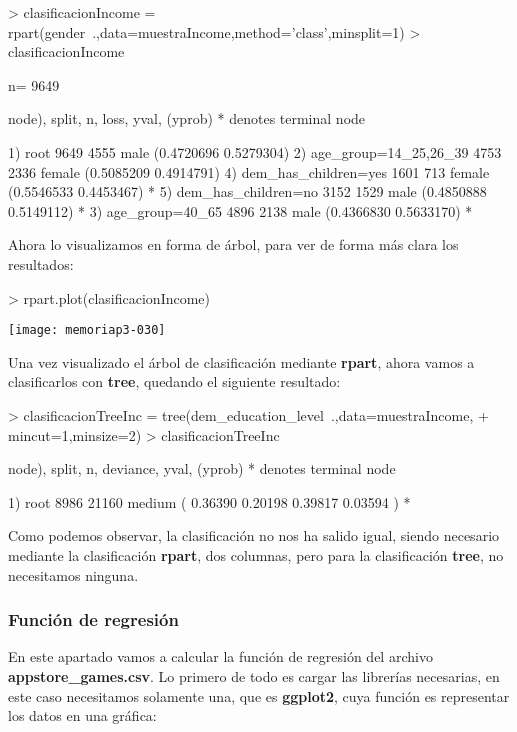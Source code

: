 \documentclass [a4paper] {article}
\begin{document}
\begin{Schunk}
\begin{Sinput}
> clasificacionIncome = rpart(gender~.,data=muestraIncome,method='class',minsplit=1)
> clasificacionIncome
\end{Sinput}
\begin{Soutput}
n= 9649 

node), split, n, loss, yval, (yprob)
      * denotes terminal node

1) root 9649 4555 male (0.4720696 0.5279304)  
  2) age_group=14_25,26_39 4753 2336 female (0.5085209 0.4914791)  
    4) dem_has_children=yes 1601  713 female (0.5546533 0.4453467) *
    5) dem_has_children=no 3152 1529 male (0.4850888 0.5149112) *
  3) age_group=40_65 4896 2138 male (0.4366830 0.5633170) *
\end{Soutput}
\end{Schunk}

Ahora lo visualizamos en forma de árbol, para ver de forma más clara los resultados:

\begin{Schunk}
\begin{Sinput}
> rpart.plot(clasificacionIncome)
\end{Sinput}
\end{Schunk}
\texttt{[image: memoriap3-030]}

Una vez visualizado el árbol de clasificación mediante \textbf{rpart}, ahora vamos a clasificarlos con \textbf{tree}, 
quedando el siguiente resultado:

\begin{Schunk}
\begin{Sinput}
> clasificacionTreeInc = tree(dem_education_level~.,data=muestraIncome, 
+ mincut=1,minsize=2)
> clasificacionTreeInc
\end{Sinput}
\begin{Soutput}
node), split, n, deviance, yval, (yprob)
      * denotes terminal node

1) root 8986 21160 medium ( 0.36390 0.20198 0.39817 0.03594 ) *
\end{Soutput}
\end{Schunk}

Como podemos observar, la clasificación no nos ha salido igual, siendo necesario mediante la clasificación \textbf{rpart}, dos columnas, 
pero para la clasificación \textbf{tree}, no necesitamos ninguna.

\subsubsection{Función de regresión}
En este apartado vamos a calcular la función de regresión del archivo \textbf{appstore\_games.csv}.
Lo primero de todo es cargar las librerías necesarias, en este caso necesitamos solamente una, que es \textbf{ggplot2}, 
cuya función es representar los datos en una
gráfica:
\end{document}
